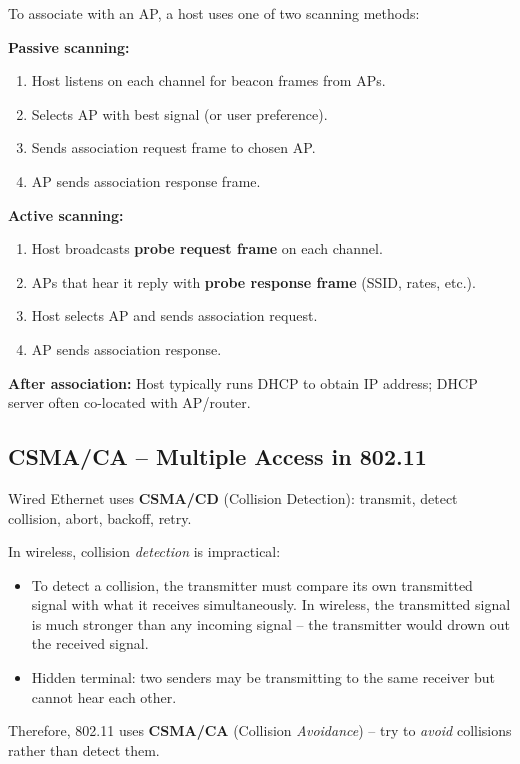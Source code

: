 \begin{keybox}
To associate with an AP, a host uses one of two scanning methods:

\medskip
\textbf{Passive scanning:}
\begin{enumerate}[noitemsep]
    \item Host listens on each channel for beacon frames from APs.
    \item Selects AP with best signal (or user preference).
    \item Sends association request frame to chosen AP.
    \item AP sends association response frame.
\end{enumerate}

\medskip
\textbf{Active scanning:}
\begin{enumerate}[noitemsep]
    \item Host broadcasts \textbf{probe request frame} on each channel.
    \item APs that hear it reply with \textbf{probe response frame} (SSID, rates, etc.).
    \item Host selects AP and sends association request.
    \item AP sends association response.
\end{enumerate}

\textbf{After association:} Host typically runs DHCP to obtain IP address; DHCP server often co-located with AP/router.
\end{keybox}

\begin{imagebox}
\end{imagebox}

\subsection{CSMA/CA -- Multiple Access in 802.11}

\begin{warnbox}
Wired Ethernet uses \textbf{CSMA/CD} (Collision Detection): transmit, detect collision, abort, backoff, retry.

\medskip
In wireless, collision \emph{detection} is impractical:
\begin{itemize}[noitemsep]
    \item To detect a collision, the transmitter must compare its own transmitted signal with what it receives simultaneously. In wireless, the transmitted signal is much stronger than any incoming signal -- the transmitter would drown out the received signal.
    \item Hidden terminal: two senders may be transmitting to the same receiver but cannot hear each other.
\end{itemize}
Therefore, 802.11 uses \textbf{CSMA/CA} (Collision \emph{Avoidance}) -- try to \emph{avoid} collisions rather than detect them.
\end{warnbox}

